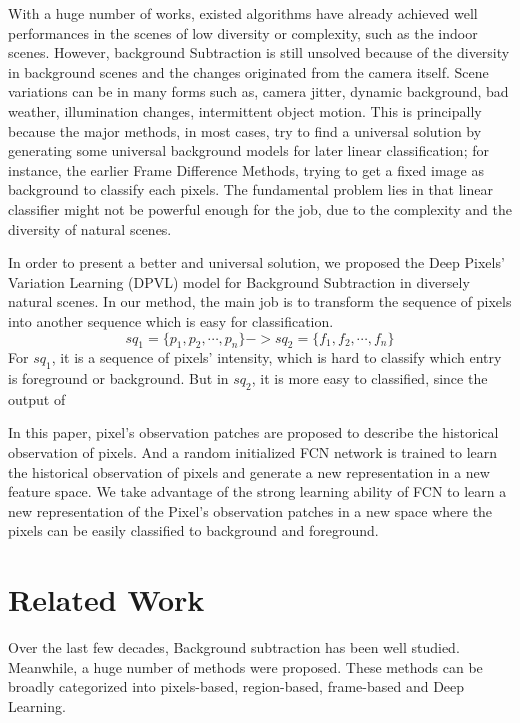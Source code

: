 \documentclass[journal]{IEEEtran}
\begin{document}
With a huge number of works, existed algorithms have already achieved well performances in the scenes of low diversity or complexity, such as the indoor scenes.
However, background Subtraction is still unsolved because of the diversity in background scenes and the changes originated from the camera itself.
Scene variations can be in many forms such as, camera jitter, dynamic background, bad weather, illumination changes, intermittent object motion.
This is principally because the major methods, in most cases, try to find a universal solution by generating some universal background models for later linear classification; for instance, the earlier Frame Difference Methods, trying to get a fixed image as background to classify each pixels.
The fundamental problem lies in that linear classifier might not be powerful enough for the job, due to the complexity and the diversity of natural scenes.

In order to present a better and universal solution, we proposed the Deep Pixels’ Variation Learning (DPVL) model for Background Subtraction in diversely natural scenes.
In our method, the main job is to transform the sequence of pixels into another sequence which is easy for classification.
\begin{equation}
    sq_1 = \{p_1,p_2,\cdots, p_n\} -> sq_2 = \{f_1, f_2, \cdots, f_n\}
\end{equation}
For $sq_1$, it is a sequence of pixels' intensity, which is hard to classify which entry is foreground or background.
%
But in $sq_2$, it is more easy to classified, since the output of

In this paper, pixel’s observation patches are proposed to describe the historical observation of pixels.
And a random initialized FCN network is trained to learn the historical observation of pixels and generate a new representation in a new feature space.
We take advantage of the strong learning ability of FCN to learn a new representation of the Pixel’s observation patches in a new space where the pixels can be easily classified to background and foreground.

\section{Related Work}
Over the last few decades, Background subtraction has been well studied. Meanwhile, a huge number of methods were proposed. These methods can be broadly categorized into pixels-based, region-based, frame-based and Deep Learning.
\end{document}
